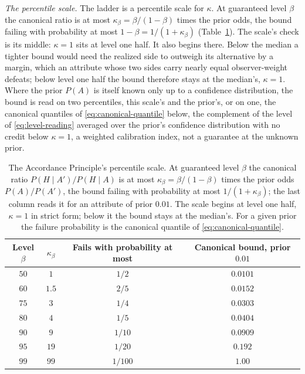 \textit{The percentile scale.} The ladder is a percentile scale for $\kappa$. At guaranteed level $\beta$ the canonical ratio is at most $\kappa_\beta = \beta/(1-\beta)$ times the prior odds, the bound failing with probability at most $1 - \beta = 1/(1+\kappa_\beta)$ (Table~\ref{tab:kappa-scale}). The scale's check is its middle: $\kappa = 1$ sits at level one half. It also begins there. Below the median a tighter bound would need the realized side to outweigh its alternative by a margin, which an attribute whose two sides carry nearly equal observer-weight defeats; below level one half the bound therefore stays at the median's, $\kappa = 1$. Where the prior $P(A)$ is itself known only up to a confidence distribution, the bound is read on two percentiles, this scale's and the prior's, or on one, the canonical quantiles of \eqref{eq:canonical-quantile} below, the complement of the level of \eqref{eq:level-reading} averaged over the prior's confidence distribution with no credit below $\kappa = 1$, a weighted calibration index, not a guarantee at the unknown prior.

\begin{table}[ht]
\centering
\small
\caption{The Accordance Principle's percentile scale. At guaranteed level $\beta$ the canonical ratio $P(H \mid A')/P(H \mid A)$ is at most $\kappa_\beta = \beta/(1-\beta)$ times the prior odds $P(A)/P(A')$, the bound failing with probability at most $1/(1+\kappa_\beta)$; the last column reads it for an attribute of prior $0.01$. The scale begins at level one half, $\kappa = 1$ in strict form; below it the bound stays at the median's. For a given prior the failure probability is the canonical quantile of \eqref{eq:canonical-quantile}.}
\label{tab:kappa-scale}
\begin{tabular}{@{}cccc@{}}
\toprule
Level $\beta$ & $\kappa_\beta$ & Fails with probability at most & Canonical bound, prior $0.01$ \\
\midrule
$50$ & $1$ & $1/2$ & $0.0101$ \\
$60$ & $1.5$ & $2/5$ & $0.0152$ \\
$75$ & $3$ & $1/4$ & $0.0303$ \\
$80$ & $4$ & $1/5$ & $0.0404$ \\
$90$ & $9$ & $1/10$ & $0.0909$ \\
$95$ & $19$ & $1/20$ & $0.192$ \\
$99$ & $99$ & $1/100$ & $1.00$ \\
\bottomrule
\end{tabular}
\end{table}

